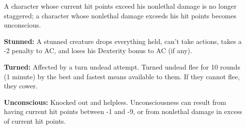\documentclass{article}
\begin{document}
A character whose current hit points exceed his nonlethal damage is no longer staggered; 
a character whose nonlethal damage exceeds his hit points becomes unconscious.

\vspace{12pt}
\textbf{Stunned: }A stunned creature drops everything held, can't take actions, 
takes a -2 penalty to AC, and loses his Dexterity bonus to AC (if any).

\vspace{12pt}
\textbf{Turned:} Affected by a turn undead attempt. Turned undead flee for 10 rounds 
(1 minute) by the best and fastest means available to them. If they cannot flee, 
they cower.

\vspace{12pt}
\textbf{Unconscious: }Knocked out and helpless. Unconsciousness can result from 
having current hit points between -1 and -9, or from nonlethal damage in excess 
of current hit points.

\newpage
\end{document}

